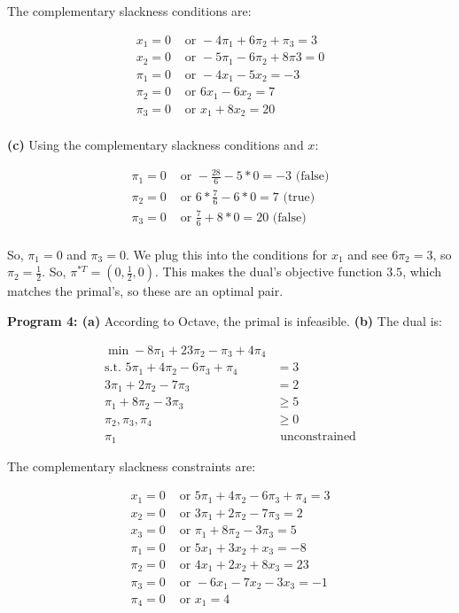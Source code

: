 \documentclass[fleqn]{homework}
\begin{document}
\begin{problem}{2}
    The complementary slackness conditions are:

    \begin{align*}
      x_1 = 0 &\text{ or } -4\pi_1 + 6\pi_2 + \pi_3 = 3 \\
      x_2 = 0 &\text{ or } -5\pi_1 - 6\pi_2 + 8\pi3 = 0 \\
      \pi_1 = 0 &\text{ or } -4x_1 - 5x_2 = -3 \\
      \pi_2 = 0 &\text{ or } 6x_1 - 6x_2 = 7 \\
      \pi_3 = 0 &\text{ or } x_1 + 8x_2 = 20 \\
    \end{align*}

    \textbf{(c)} Using the complementary slackness conditions and $x$:

    \begin{align*}
      \pi_1 = 0 &\text{ or } -\frac{28}{6} - 5*0 = -3 \text{ (false)} \\
      \pi_2 = 0 &\text{ or } 6*\frac{7}{6} - 6*0 = 7 \text{ (true)} \\
      \pi_3 = 0 &\text{ or } \frac{7}{6} + 8*0 = 20 \text{ (false)} \\
    \end{align*}

    So, $\pi_1 = 0$ and $\pi_3 = 0$.  We plug this into the conditions for $x_1$
    and see $6\pi_2 = 3$, so $\pi_2 = \frac{1}{2}$.  So,
    $\pi^{*T} = (0, \frac{1}{2}, 0)$.  This makes the dual's objective function
    $3.5$, which matches the primal's, so these are an optimal pair.

    \textbf{Program 4: (a)} According to Octave, the primal is infeasible.
    \textbf{(b)} The dual is:

    \begin{align*}
      \min -8\pi_1 + 23\pi_2 - \pi_3 + 4\pi_4 &\\
      \text{s.t. } 5\pi_1 + 4\pi_2 - 6\pi_3 + \pi_4 &= 3 \\
      3\pi_1 + 2\pi_2 - 7\pi_3 &= 2 \\
      \pi_1 + 8\pi_2 - 3\pi_3 &\ge 5 \\
      \pi_2, \pi_3, \pi_4 &\ge 0 \\
      \pi_1 &\text{ unconstrained}
    \end{align*}

    The complementary slackness constraints are:

    \begin{align*}
      x_1 = 0 &\text{ or } 5\pi_1 + 4\pi_2 - 6\pi_3 + \pi_4 = 3 \\
      x_2 = 0 &\text{ or } 3\pi_1 + 2\pi_2 - 7\pi_3 = 2 \\
      x_3 = 0 &\text{ or } \pi_1 + 8\pi_2 - 3\pi_3 = 5 \\
      \pi_1 = 0 &\text{ or } 5x_1 + 3x_2 + x_3 = -8 \\
      \pi_2 = 0 &\text{ or } 4x_1 + 2x_2 + 8x_3 = 23 \\
      \pi_3 = 0 &\text{ or } -6x_1 - 7x_2 - 3x_3 = -1 \\
      \pi_4 = 0 &\text{ or } x_1 = 4 \\
    \end{align*}


\end{problem}
\end{document}
